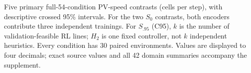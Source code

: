 \begin{table}[pos=tbp]
\centering
\caption{Five primary full-54-condition PV-speed contrasts (cells per step), with descriptive crossed 95\% intervals. For the two $S_0$ contrasts, both encoders contribute three independent trainings. For $S_{.95}$ (C95), $k$ is the number of validation-feasible RL lines; $H_2$ is one fixed controller, not $k$ independent heuristics. Every condition has 30 paired environments. Values are displayed to four decimals; exact source values and all 42 domain summaries accompany the supplement.}
\label{tab:evidence}
\begingroup\small

\endgroup
\end{table}
